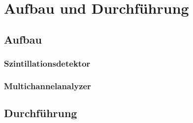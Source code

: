 \section{Aufbau und Durchführung}
\subsection{Aufbau}


\subsubsection{Szintillationsdetektor}


\subsubsection{Multichannelanalyzer}



\subsection{Durchführung}



